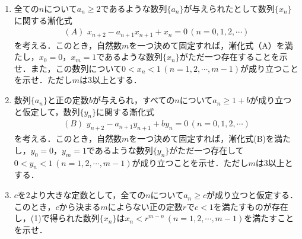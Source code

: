 \documentclass[../../main.tex]{subfiles}
\begin{document}
\begin{enumerate}
  \item 全ての$n$について$a_n\ge 2$であるような数列$\{a_n\}$が与えられたとして数列$\{x_n\}$に関する漸化式
    \begin{align*}
      (A)\,\, x_{n+2}-a_{n+1}x_{n+1}+x_n=0 \, (n=0,1,2,\cdots)
    \end{align*}
    を考える．このとき，自然数$m$を一つ決めて固定すれば，漸化式（A）を満たし，$x_0=0$，$x_m=1$であるような数列$\{x_n\}$がただ一つ存在することを示せ．また，この数列について$0<x_n<1\, (n=1,2,\cdots,m-1)$が成り立つことを示せ．ただし$m$は$3$以上とする．
  \item 数列$\{a_n\}$と正の定数$b$が与えられ，すべての$n$について$a_n\ge 1+b$が成り立つと仮定して，数列$\{y_n\}$に関する漸化式
    \begin{align*}
      (B)\,\, y_{n+2}-a_{n+1}y_{n+1}+by_n=0 \, (n=0,1,2,\cdots)
    \end{align*}
    を考える．このとき，自然数$m$を一つ決めて固定すれば，漸化式(B)を満たし，$y_0=0$，$y_m=1$であるような数列$\{y_n\}$がただ一つ存在して$0<y_n<1\, (n=1,2,\cdots,m-1)$が成り立つことを示せ．ただし$m$は$3$以上とする．
  \item $c$を$2$より大きな定数として，全ての$n$について$a_n\ge c$が成り立つと仮定する．このとき，$c$から決まる$m$によらない正の定数$r$で$c<1$を満たすものが存在し，(1)で得られた数列$\{x_n\}$は$x_n<r^{m-n}\, (n=1,2,\cdots,m-1)$を満たすことを示せ．
\end{enumerate}
\end{document}
